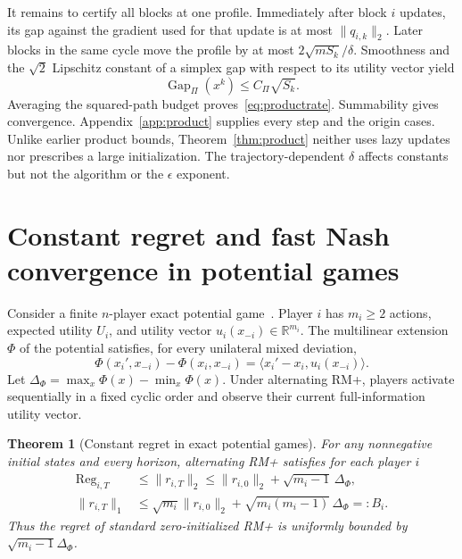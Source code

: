 \documentclass{article}
\newtheorem{theorem}{Theorem}
\newcommand{\Reg}{\operatorname{Reg}}
\newcommand{\Gap}{\operatorname{Gap}}
\begin{document}
It remains to certify all blocks at one profile. Immediately after block $i$ updates, its gap against the gradient used for that update is at most $\|q_{i,k}\|_2$. Later blocks in the same cycle move the profile by at most $2\sqrt{mS_k}/\delta$. Smoothness and the $\sqrt2$ Lipschitz constant of a simplex gap with respect to its utility vector yield
\begin{equation}
\Gap_\Pi(x^k)\le C_\Pi\sqrt{S_k}.
\label{eq:endpointtransfer}
\end{equation}
Averaging the squared-path budget proves~\eqref{eq:productrate}. Summability gives convergence. Appendix~\ref{app:product} supplies every step and the origin cases. Unlike earlier product bounds, Theorem~\ref{thm:product} neither uses lazy updates nor prescribes a large initialization. The trajectory-dependent $\delta$ affects constants but not the algorithm or the $\epsilon$ exponent.

\section{Constant regret and fast Nash convergence in potential games}
\label{sec:potential}

Consider a finite $n$-player exact potential game~\citep{Monderer96:Potential}. Player $i$ has $m_i\ge2$ actions, expected utility $U_i$, and utility vector $u_i(x_{-i})\in\mathbb R^{m_i}$. The multilinear extension $\Phi$ of the potential satisfies, for every unilateral mixed deviation,
\begin{equation}
\Phi(x_i',x_{-i})-\Phi(x_i,x_{-i})
=\langle x_i'-x_i,u_i(x_{-i})\rangle.
\label{eq:potentialidentity}
\end{equation}
Let $\Delta_\Phi=\max_x\Phi(x)-\min_x\Phi(x)$. Under alternating RM+, players activate sequentially in a fixed cyclic order and observe their current full-information utility vector.

\begin{theorem}[Constant regret in exact potential games]
\label{thm:potentialregret}
For any nonnegative initial states and every horizon, alternating RM+ satisfies for each player $i$
\begin{align}
\Reg_{i,T}
&\le\|r_{i,T}\|_2
\le\|r_{i,0}\|_2+\sqrt{m_i-1}\,\Delta_\Phi,
\label{eq:potentialregret}\\
\|r_{i,T}\|_1
&\le \sqrt{m_i}\|r_{i,0}\|_2
+\sqrt{m_i(m_i-1)}\,\Delta_\Phi=:B_i.
\label{eq:potentiall1}
\end{align}
Thus the regret of standard zero-initialized RM+ is uniformly bounded by $\sqrt{m_i-1}\Delta_\Phi$.
\end{theorem}
\end{document}
